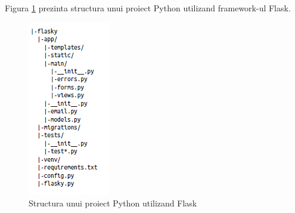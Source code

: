 Figura \ref{fig:FlaskProjectStructure} prezinta structura unui proiect Python utilizand framework-ul Flask.
\begin{figure}[H]
    \centering
    \includegraphics[scale=0.75]{figs/FlaskProjectStructure.png}
    \caption{Structura unui proiect Python utilizand Flask}
    \label{fig:FlaskProjectStructure}
\end{figure}

